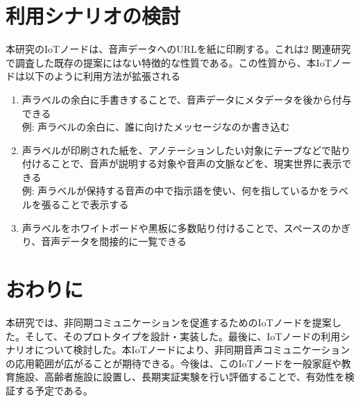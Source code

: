 \documentclass[submit,techrep,noauthor]{ipsj}
\begin{document}
\section{利用シナリオの検討}
本研究のIoTノードは、音声データへのURLを紙に印刷する。これは2 関連研究で調査した既存の提案にはない特徴的な性質である。この性質から、本IoTノードは以下のように利用方法が拡張される
\begin{enumerate}
    \item 声ラベルの余白に手書きすることで、音声データにメタデータを後から付与できる\\例: 声ラベルの余白に、誰に向けたメッセージなのか書き込む
    \item 声ラベルが印刷された紙を、アノテーションしたい対象にテープなどで貼り付けることで、音声が説明する対象や音声の文脈などを、現実世界に表示できる\cite{cyber} \\例: 声ラベルが保持する音声の中で指示語を使い、何を指しているかをラベルを張ることで表示する
    \item 声ラベルをホワイトボードや黒板に多数貼り付けることで、スペースのかぎり、音声データを間接的に一覧できる
\end{enumerate}

\section{おわりに}
本研究では、非同期コミュニケーションを促進するためのIoTノードを提案した。そして、そのプロトタイプを設計・実装した。最後に、IoTノードの利用シナリオについて検討した。本IoTノードにより、非同期音声コミュニケーションの応用範囲が広がることが期待できる。今後は、このIoTノードを一般家庭や教育施設、高齢者施設に設置し、長期実証実験を行い評価することで、有効性を検証する予定である。



 
\end{document}
